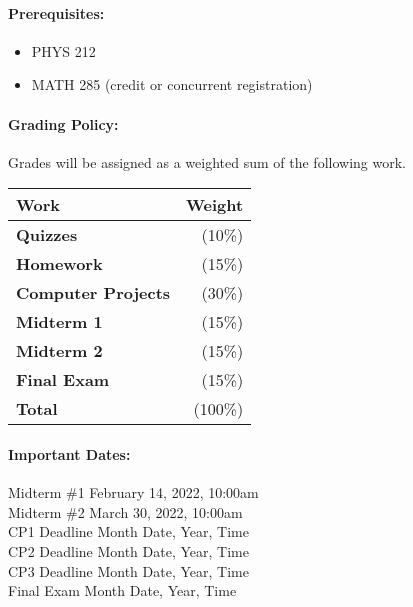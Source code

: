 \documentclass[11pt, a4paper]{article}
\begin{document}
\paragraph{Prerequisites:}
\begin{itemize}
\item PHYS 212
\item MATH 285 (credit or concurrent registration)
\end{itemize}

\paragraph{Grading Policy:} Grades will be assigned as a weighted sum of the following work.

\begin{table}[h]
\begin{tabularx}{\textwidth}{Xr}
\textbf{Work} & \textbf{Weight}\\
\hline
\textbf{Quizzes} & (10\%) \\
\textbf{Homework} & (15\%) \\
\textbf{Computer Projects} & (30\%) \\
\textbf{Midterm 1} & (15\%) \\
\textbf{Midterm 2} & (15\%) \\
\textbf{Final Exam} & (15\%) \\
\hline
\textbf{Total} & (100\%) \\
\end{tabularx}
\end{table}

\paragraph{Important Dates:}
\begin{center} \begin{minipage}{3.8in}
\begin{flushleft}
Midterm \#1       \dotfill February 14, 2022, 10:00am  \\
Midterm \#2       \dotfill March 30, 2022, 10:00am  \\
CP1 Deadline      \dotfill Month Date, Year, Time  \\
CP2 Deadline      \dotfill Month Date, Year, Time  \\
CP3 Deadline      \dotfill Month Date, Year, Time  \\
Final Exam        \dotfill Month Date, Year, Time  \\
\end{flushleft}
\end{minipage}
\end{center}
\end{document}
